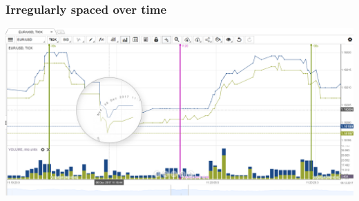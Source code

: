 \documentclass{beamer}
\begin{document}
\begin{frame}
\frametitle{Irregularly spaced over time}
\centerline{
\includegraphics[width=\paperwidth,height=0.7\paperheight]{img/hft-ticks-zoom.png}
}
\end{frame}
\end{document}
